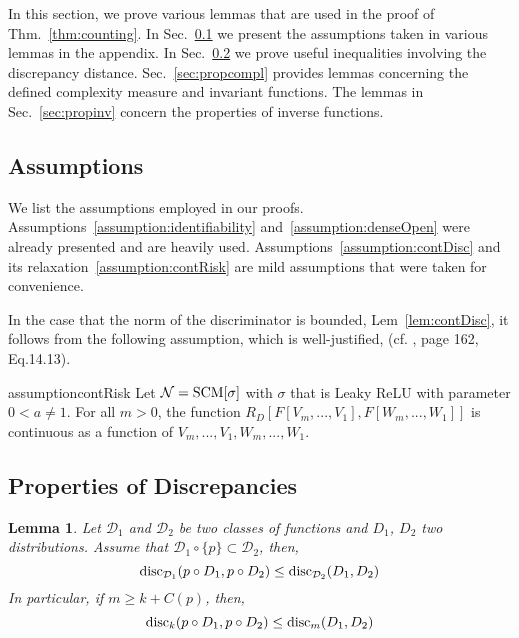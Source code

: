 \documentclass{article} %
\newtheorem{lem}{Lemma}
\newcommand{\disc}{\textnormal{disc}}
\begin{document}
In this section, we prove various lemmas that are used in the proof of Thm.~\ref{thm:counting}. In Sec.~\ref{sec:assumptions} we present the assumptions taken in various lemmas in the appendix. In Sec.~\ref{sec:propdisc} we prove useful inequalities involving the discrepancy distance. Sec.~\ref{sec:propcompl} provides lemmas concerning the defined complexity measure and invariant functions. The lemmas in Sec.~\ref{sec:propinv} concern the properties of inverse functions.

 

\subsection{Assumptions}
\label{sec:assumptions}

We list the assumptions employed in our proofs. Assumptions~\ref{assumption:identifiability} and~\ref{assumption:denseOpen} were already presented and are heavily used.  Assumptions~\ref{assumption:contDisc} and its relaxation~\ref{assumption:contRisk} are mild assumptions that were taken for convenience.

 

\identif*

\denseOpen*

 


 

\contDisc*

 

In the case that the norm of the discriminator is bounded, Lem~\ref{lem:contDisc}, it follows from the following assumption, which is well-justified, (cf. \cite{Shalev-Shwartz:2014:UML:2621980}, page 162, Eq.14.13).

\begin{restatable}{assumption}{contRisk}\label{assumption:contRisk}  Let $\mathcal{N} = \textnormal{SCM}[\sigma]$ with $\sigma$ that is Leaky ReLU with parameter $0<a\neq 1$. For all $m>0$, the function $R_D\left[F[V_{m},...,V_1] ,F[W_{m},...,W_1]\right]$ is continuous as a function of $V_m,...,V_1,W_m,...,W_1$.
\end{restatable}

\subsection{Properties of Discrepancies}

\label{sec:propdisc}

\begin{lem}\label{lem:disc} Let $\mathcal{D}_1$ and $\mathcal{D}_2$ be two classes of functions and $D_1$, $D_2$ two distributions. Assume that $\mathcal{D}_1\circ \{ p \} \subset \mathcal{D}_2$, then,
\begin{equation}
\disc_{\mathcal{D}_1}(p \circ D_1, p\circ D_2) \leq\disc_{\mathcal{D}_2}(D_1, D_2)
\end{equation}
In particular, if $m \geq k+ C(p)$, then, 
\begin{equation}
\disc_{k}(p \circ D_1, p\circ D_2) \leq
\disc_{m}(D_1, D_2)
\end{equation}
\end{lem}
\end{document}
